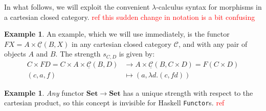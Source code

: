\documentclass[11pt,a4paper]{article}
\theoremstyle{plain}
\theoremstyle{definition}
\newtheorem{example}[theorem]{Example}
\newcommand{\C}{\mathscr{C}}
\newcommand{\homC}{\underline{\C}}
\newcommand{\Set}{\mathbf{Set}}
\newcommand{\todo}[1]{\textcolor{red}{\small #1}}
\begin{document}
In what follows, we will exploit the convenient $\lambda$-calculus syntax for morphisms in a cartesian closed category. \todo{ref} \todo{this sudden change in notation is a bit confusing}

\begin{example}
  An example, which we will use immediately, is the functor $FX = A \times \homC(B, X)$ in any cartesian closed category $\C$, and with any pair of objects $A$ and $B$. The strength $s_{C,D}$ is given by:
  \begin{align*}
    C \times FD = C \times A \times \homC(B, D) &\to A \times \homC(B, C \times D) = F(C \times D)\\
    (c, a, f) &\mapsto (a, \lambda d. (c, fd))
  \end{align*}
\end{example}

\begin{example}
  \emph{Any} functor $\Set \to \Set$ has a unique strength with respect to the cartesian product, so this concept is invisible for Haskell \texttt{Functor}s. \todo{ref}
\end{example}
\end{document}
